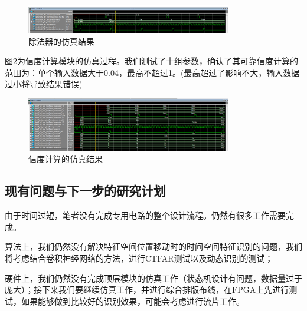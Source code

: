 \begin{figure}[htbp]
   \centering
   \includegraphics[width=0.8\textwidth]{DividerSim.png} %
   \caption{除法器的仿真结果}
   \label{fig:divsim}
\end{figure}


图\ref{fig:belisim}为信度计算模块的仿真过程。我们测试了十组参数，确认了其可靠信度计算的范围为：单个输入数据大于0.04，最高不超过1。(最高超过了影响不大，输入数据过小将导致结果错误)

\begin{figure}[htbp]
   \centering
   \includegraphics[width=0.8\textwidth]{BelicalSim.png} %
   \caption{信度计算的仿真结果}
   \label{fig:belisim}
\end{figure}

\subsection{现有问题与下一步的研究计划}
由于时间过短，笔者没有完成专用电路的整个设计流程。仍然有很多工作需要完成。

算法上，我们仍然没有解决特征空间位置移动时的时间空间特征识别的问题，我们将考虑结合卷积神经网络的方法，进行CTFAR测试以及动态识别的测试；

硬件上，我们仍然没有完成顶层模块的仿真工作（状态机设计有问题，数据量过于庞大）；接下来我们要继续仿真工作，并进行综合排版布线，在FPGA上先进行测试，如果能够做到比较好的识别效果，可能会考虑进行流片工作。

